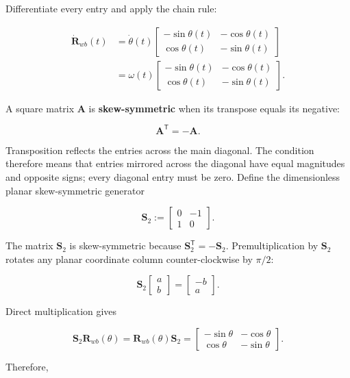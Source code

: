 \documentclass[
  australian,
  12pt,
  letterpaper,
  DIV=11,
  numbers=noendperiod,
  twoside]{scrreprt}
\begin{document}
Differentiate every entry and apply the chain rule:

\[
\begin{aligned}
\dot{\mathbf R}_{wb}(t)
&=
\dot\theta(t)
\begin{bmatrix}
-\sin\theta(t)&-\cos\theta(t)\\
\cos\theta(t)&-\sin\theta(t)
\end{bmatrix}\\
&=
\omega(t)
\begin{bmatrix}
-\sin\theta(t)&-\cos\theta(t)\\
\cos\theta(t)&-\sin\theta(t)
\end{bmatrix}.
\end{aligned}
\]

A square matrix \(\mathbf A\) is \textbf{skew-symmetric} when its
transpose equals its negative:

\[
\boxed{
\mathbf A^\mathsf T
=
-\mathbf A
}.
\]

Transposition reflects the entries across the main diagonal. The
condition therefore means that entries mirrored across the diagonal have
equal magnitudes and opposite signs; every diagonal entry must be zero.
Define the dimensionless planar skew-symmetric generator

\[
\boxed{
\mathbf S_2
\mathrel{:=}
\begin{bmatrix}
0&-1\\
1&0
\end{bmatrix}
}.
\]

The matrix \(\mathbf S_2\) is skew-symmetric because
\(\mathbf S_2^\mathsf T=-\mathbf S_2\). Premultiplication by
\(\mathbf S_2\) rotates any planar coordinate column counter-clockwise
by \(\pi/2\):

\[
\mathbf S_2
\begin{bmatrix}
a\\b
\end{bmatrix}
=
\begin{bmatrix}
-b\\a
\end{bmatrix}.
\]

Direct multiplication gives

\[
\mathbf S_2\mathbf R_{wb}(\theta)
=
\mathbf R_{wb}(\theta)\mathbf S_2
=
\begin{bmatrix}
-\sin\theta&-\cos\theta\\
\cos\theta&-\sin\theta
\end{bmatrix}.
\]

Therefore,
\end{document}
